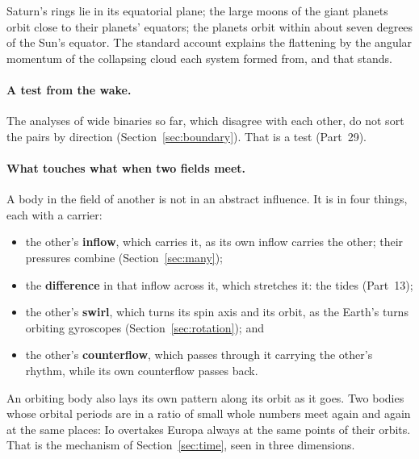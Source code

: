 \documentclass[11pt,a4paper]{article}
\begin{document}
 Saturn's rings lie in its equatorial plane; the large moons of the giant planets orbit close to their planets' equators; the planets orbit within about seven degrees of the Sun's equator. The standard account explains the flattening by the angular momentum of the collapsing cloud each system formed from, and that stands. 

\paragraph{A test from the wake.}  The analyses of wide binaries so far, which disagree with each other, do not sort the pairs by direction (Section~\ref{sec:boundary}). That is a test (Part~29).

\paragraph{What touches what when two fields meet.} A body in the field of another is not in an abstract influence. It is in four things, each with a carrier:
\begin{itemize}
\item the other's \textbf{inflow}, which carries it, as its own inflow carries the other; their pressures combine (Section~\ref{sec:many});
\item the \textbf{difference} in that inflow across it, which stretches it: the tides (Part~13);
\item the other's \textbf{swirl}, which turns its spin axis and its orbit, as the Earth's turns orbiting gyroscopes (Section~\ref{sec:rotation}); and
\item the other's \textbf{counterflow}, which passes through it carrying the other's rhythm, while its own counterflow passes back.
\end{itemize}
An orbiting body also lays its own pattern along its orbit as it goes. Two bodies whose orbital periods are in a ratio of small whole numbers meet again and again at the same places: Io overtakes Europa always at the same points of their orbits.  That is the mechanism of Section~\ref{sec:time}, seen in three dimensions.
\end{document}
